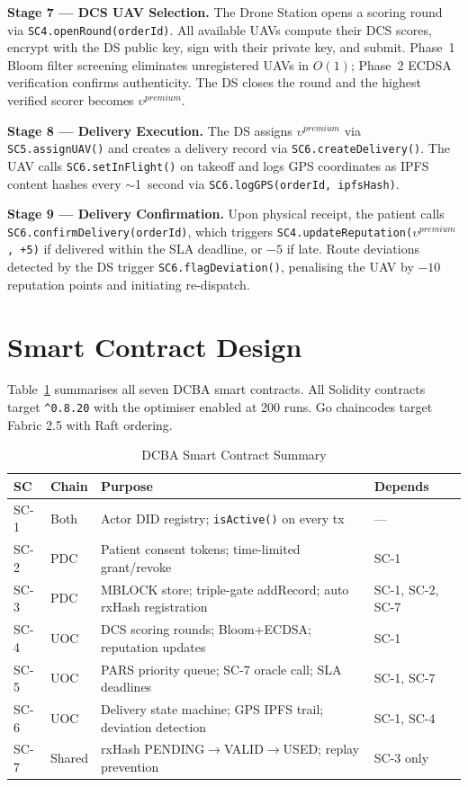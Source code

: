 \documentclass[sigplan,screen,review=false]{acmart}
\begin{document}
\textbf{Stage 7 --- DCS UAV Selection.} The Drone Station opens a
scoring round via \texttt{SC4.openRound(orderId)}. All available UAVs
compute their DCS scores, encrypt with the DS public key, sign with
their private key, and submit. Phase~1 Bloom filter screening eliminates
unregistered UAVs in $O(1)$; Phase~2 ECDSA verification confirms
authenticity. The DS closes the round and the highest verified scorer
becomes $\upsilon^{premium}$.

\textbf{Stage 8 --- Delivery Execution.} The DS assigns $\upsilon^{premium}$
via \texttt{SC5.assignUAV()} and creates a delivery record via
\texttt{SC6.createDelivery()}. The UAV calls \texttt{SC6.setInFlight()}
on takeoff and logs GPS coordinates as IPFS content hashes every
$\sim$1~second via \texttt{SC6.logGPS(orderId, ipfsHash)}.

\textbf{Stage 9 --- Delivery Confirmation.} Upon physical receipt, the
patient calls \texttt{SC6.confirmDelivery(orderId)}, which triggers
\texttt{SC4.updateReputation($\upsilon^{premium}$, +5)} if delivered
within the SLA deadline, or $-5$ if late. Route deviations detected by
the DS trigger \texttt{SC6.flagDeviation()}, penalising the UAV by
$-10$ reputation points and initiating re-dispatch.

\section{Smart Contract Design}
\label{sec:smartcontracts}

Table~\ref{tab:contracts} summarises all seven DCBA smart contracts.
All Solidity contracts target \texttt{\^{}0.8.20} with the optimiser
enabled at 200 runs. Go chaincodes target Fabric 2.5 with Raft ordering.

\begin{table}[h]
\centering
\caption{DCBA Smart Contract Summary}
\label{tab:contracts}
\begin{tabular}{@{}p{1.1cm}p{1cm}p{3cm}p{1.6cm}@{}}
\toprule
\textbf{SC} & \textbf{Chain} & \textbf{Purpose} & \textbf{Depends} \\
\midrule
SC-1 & Both  & Actor DID registry; \texttt{isActive()} on every tx & --- \\
SC-2 & PDC   & Patient consent tokens; time-limited grant/revoke  & SC-1 \\
SC-3 & PDC   & MBLOCK store; triple-gate addRecord; auto rxHash registration & SC-1, SC-2, SC-7 \\
SC-4 & UOC   & DCS scoring rounds; Bloom+ECDSA; reputation updates & SC-1 \\
SC-5 & UOC   & PARS priority queue; SC-7 oracle call; SLA deadlines & SC-1, SC-7 \\
SC-6 & UOC   & Delivery state machine; GPS IPFS trail; deviation detection & SC-1, SC-4 \\
SC-7 & Shared & rxHash PENDING$\to$VALID$\to$USED; replay prevention & SC-3 only \\
\bottomrule
\end{tabular}
\end{table}
\end{document}
